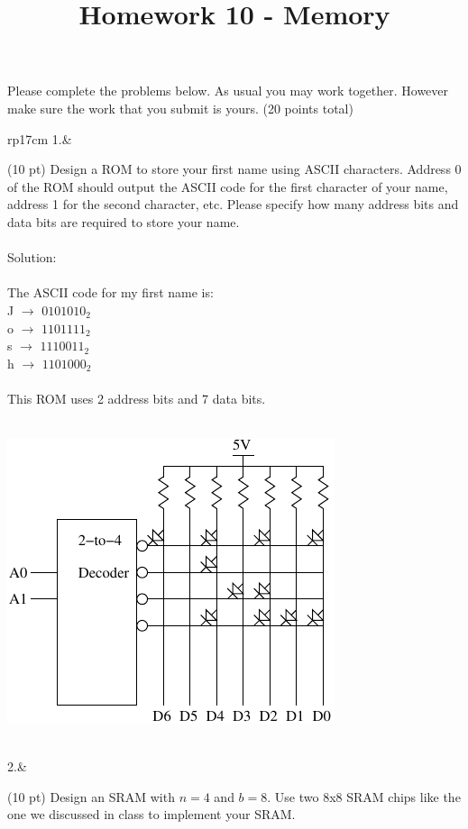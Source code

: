 \documentclass{article}
\title{Homework 10 - Memory}
\date{}
\begin{document}
\maketitle
Please complete the problems below.  As usual you may work together.  However make sure the work that you submit is yours. (20 points total)
\begin{longtable}[l]{rp{17cm}}
1.&\begin{minipage}[t]{\linewidth}(10 pt) Design a ROM to store your first name using ASCII characters.  Address 0 of the ROM should output the ASCII code for the first character of your name, address 1 for the second character, etc.  Please specify how many address bits and data bits are required to store your name.\\ \\

Solution: \\ \\
The ASCII code for my first name is:\\
J $\rightarrow$ $0101010_2$\\
o $\rightarrow$ $1101111_2$\\
s $\rightarrow$ $1110011_2$\\
h $\rightarrow$ $1101000_2$\\ \\
This ROM uses 2 address bits and 7 data bits.\\ \\
\begin{center}
  \includegraphics{../Memory/Assessments/ROMName}
\end{center}
\end{minipage}\\
\medskip
2.&\begin{minipage}[t]{\linewidth}(10 pt) Design an SRAM with $n=4$ and $b=8$.  Use two 8x8 SRAM chips like the one we discussed in class to implement your SRAM.


\end{minipage}
\end{longtable}
\end{document}
